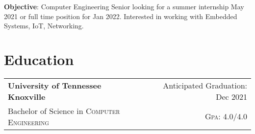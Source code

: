 \documentclass[a4paper,11pt]{article}
\begin{document}

\pagestyle{empty} %

\par{ \smallskip
\par{\textbf{Objective}: Computer Engineering Senior looking for a summer internship May 2021 or full time position for Jan 2022.
Interested in working with Embedded Systems, IoT, Networking.
}\smallskip}



\section{Education}
\begin{tabularx}{\textwidth}{lXr}
   \textbf{University of Tennessee Knoxville} & & Anticipated Graduation: Dec 2021\\
   Bachelor of Science in \textsc{Computer Engineering} &  & \normalsize \textsc{Gpa}: 4.0/4.0\\
\end{tabularx}

\end{document}

